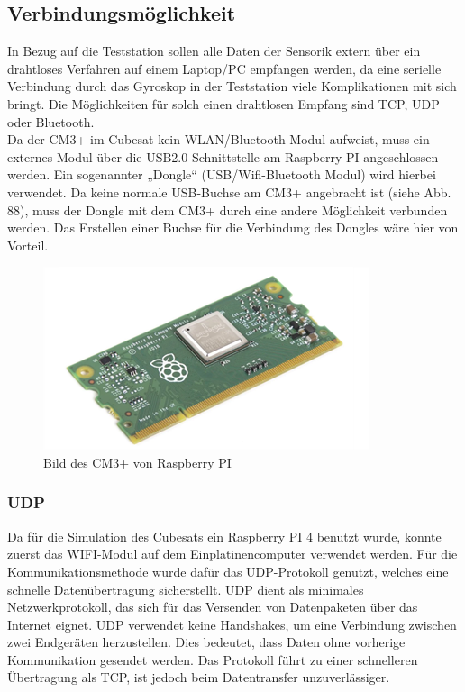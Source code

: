 \subsection{Verbindungsmöglichkeit }\label{Verbindung}
\SecAuth{\nameCZ}
In Bezug auf die Teststation sollen alle Daten der Sensorik extern über ein drahtloses Verfahren auf einem Laptop/PC empfangen werden, da eine serielle Verbindung durch das Gyroskop in der Teststation viele Komplikationen mit sich bringt. Die Möglichkeiten für solch einen drahtlosen Empfang sind TCP, UDP oder Bluetooth. \\
\vspace{3mm}
Da der CM3+ im Cubesat kein WLAN/Bluetooth-Modul aufweist, muss ein externes Modul über die USB2.0 Schnittstelle am Raspberry PI angeschlossen werden. Ein sogenannter „Dongle“ (USB/Wifi-Bluetooth Modul) wird hierbei verwendet. Da keine normale USB-Buchse am CM3+ angebracht ist (siehe Abb. 88), muss der Dongle mit dem CM3+ durch eine andere Möglichkeit verbunden werden. Das Erstellen einer Buchse für die Verbindung des Dongles wäre hier von Vorteil. \\
\vspace{3mm}
\begin{figure}[H]
	\centering
	\includegraphics[scale=0.8]{image/cm3+.png}
	\caption{Bild des CM3+ von Raspberry PI}
\end{figure}
\vspace{3mm}
\subsubsection{UDP}\label{udp}
Da für die Simulation des Cubesats ein Raspberry PI 4 benutzt wurde, konnte zuerst das WIFI-Modul auf dem Einplatinencomputer verwendet werden. Für die Kommunikationsmethode wurde dafür das UDP-Protokoll genutzt, welches eine schnelle Datenübertragung sicherstellt. UDP\autocite{UDP} dient als minimales Netzwerkprotokoll, das sich für das Versenden von Datenpaketen über das Internet eignet. UDP verwendet keine Handshakes, um eine Verbindung zwischen zwei Endgeräten herzustellen. Dies bedeutet, dass Daten ohne vorherige Kommunikation gesendet werden. Das Protokoll führt zu einer schnelleren Übertragung als TCP, ist jedoch beim Datentransfer unzuverlässiger.


